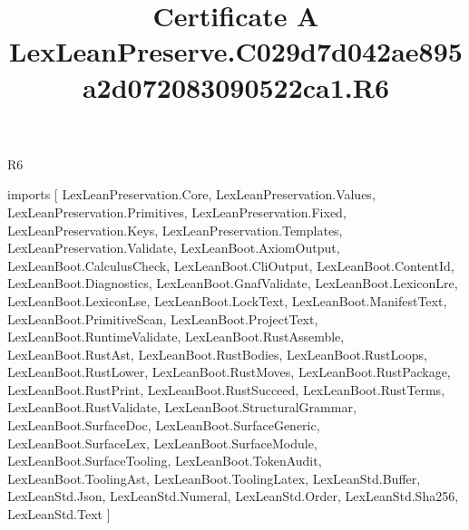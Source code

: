 \begin{lexlean}{R6}
\title{Certificate A LexLeanPreserve.C029d7d042ae895a2d072083090522ca1.R6}
\begin{coremodule}
imports [
  LexLeanPreservation.Core,
  LexLeanPreservation.Values,
  LexLeanPreservation.Primitives,
  LexLeanPreservation.Fixed,
  LexLeanPreservation.Keys,
  LexLeanPreservation.Templates,
  LexLeanPreservation.Validate,
  LexLeanBoot.AxiomOutput,
  LexLeanBoot.CalculusCheck,
  LexLeanBoot.CliOutput,
  LexLeanBoot.ContentId,
  LexLeanBoot.Diagnostics,
  LexLeanBoot.GnafValidate,
  LexLeanBoot.LexiconLre,
  LexLeanBoot.LexiconLse,
  LexLeanBoot.LockText,
  LexLeanBoot.ManifestText,
  LexLeanBoot.PrimitiveScan,
  LexLeanBoot.ProjectText,
  LexLeanBoot.RuntimeValidate,
  LexLeanBoot.RustAssemble,
  LexLeanBoot.RustAst,
  LexLeanBoot.RustBodies,
  LexLeanBoot.RustLoops,
  LexLeanBoot.RustLower,
  LexLeanBoot.RustMoves,
  LexLeanBoot.RustPackage,
  LexLeanBoot.RustPrint,
  LexLeanBoot.RustSucceed,
  LexLeanBoot.RustTerms,
  LexLeanBoot.RustValidate,
  LexLeanBoot.StructuralGrammar,
  LexLeanBoot.SurfaceDoc,
  LexLeanBoot.SurfaceGeneric,
  LexLeanBoot.SurfaceLex,
  LexLeanBoot.SurfaceModule,
  LexLeanBoot.SurfaceTooling,
  LexLeanBoot.TokenAudit,
  LexLeanBoot.ToolingAst,
  LexLeanBoot.ToolingLatex,
  LexLeanStd.Buffer,
  LexLeanStd.Json,
  LexLeanStd.Numeral,
  LexLeanStd.Order,
  LexLeanStd.Sha256,
  LexLeanStd.Text
]


\end{coremodule}
\end{lexlean}
